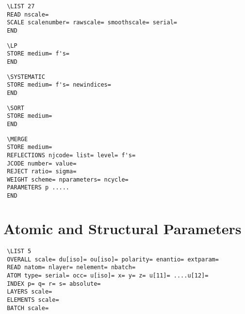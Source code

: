 \documentclass[10pt,a4paper]{report}
\begin{document}
\bigskip{}



\small\begin{verbatim}
 \LIST 27
 READ nscale=
 SCALE scalenumber= rawscale= smoothscale= serial=
 END
\end{verbatim}\normalsize




\bigskip{}



\small\begin{verbatim}
 \LP
 STORE medium= f's=
 END
\end{verbatim}\normalsize




\bigskip{}



\small\begin{verbatim}
 \SYSTEMATIC
 STORE medium= f's= newindices=
 END
\end{verbatim}\normalsize




\bigskip{}



\small\begin{verbatim}
 \SORT
 STORE medium=
 END
\end{verbatim}\normalsize




\bigskip{}



\small\begin{verbatim}
 \MERGE
 STORE medium=
 REFLECTIONS njcode= list= level= f's=
 JCODE number= value=
 REJECT ratio= sigma=
 WEIGHT scheme= nparameters= ncycle=
 PARAMETERS p .....
 END
\end{verbatim}\normalsize


\section{Atomic and Structural Parameters}


\bigskip{}



\small\begin{verbatim}
 \LIST 5
 OVERALL scale= du[iso]= ou[iso]= polarity= enantio= extparam=
 READ natom= nlayer= nelement= nbatch=
 ATOM type= serial= occ= u[iso]= x= y= z= u[11]= ....u[12]=
 INDEX p= q= r= s= absolute=
 LAYERS scale=
 ELEMENTS scale=
 BATCH scale=
\end{verbatim}\normalsize
\end{document}
